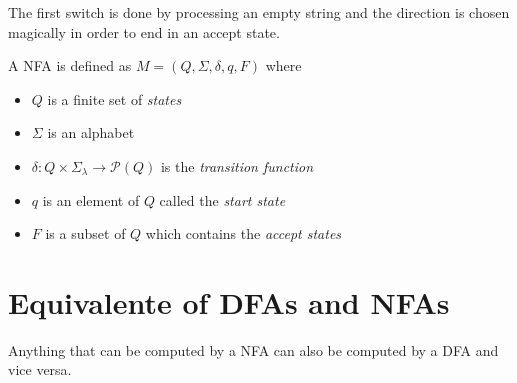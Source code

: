 \documentclass{article}
\newcommand{\emptyString}{\lambda}
\begin{document}
\begin{center}
\end{center}
The first switch is done by processing an empty string and the direction is chosen magically
in order to end in an accept state.

A NFA is defined as \(M=(Q, \Sigma, \delta, q, F)\) where
\begin{itemize}
    \item \(Q\) is a finite set of \textit{states}
    \item \(\Sigma\) is an alphabet
    \item \(\delta : Q \times \Sigma_\emptyString \to \mathcal{P}(Q)\) is the \textit{transition function}
    \item \(q\) is an element of \(Q\) called the \textit{start state}
    \item \(F\) is a subset of \(Q\) which contains the \textit{accept states}
\end{itemize}

\section{Equivalente of DFAs and NFAs}

Anything that can be computed by a NFA can also be computed by a DFA and vice versa.
\end{document}
